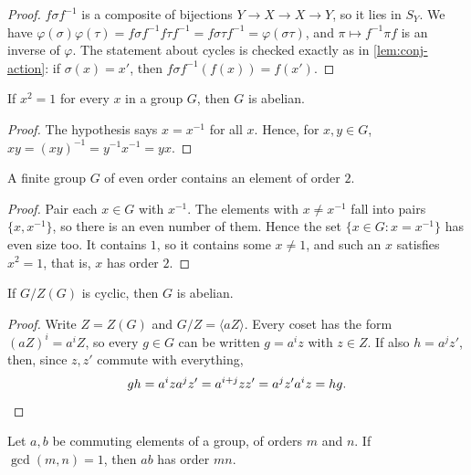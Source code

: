 \begin{proof}
	\(f\sigma f^{-1}\) is a composite of bijections \(Y \to X \to X \to Y\), so it lies in
	\(S_Y\). We have
	\(\varphi(\sigma)\varphi(\tau) = f\sigma f^{-1} f\tau f^{-1} = f\sigma\tau f^{-1}
	= \varphi(\sigma\tau)\), and \(\pi \mapsto f^{-1}\pi f\) is an inverse of
	\(\varphi\). The statement about cycles is checked exactly as in
	\autoref{lem:conj-action}: if \(\sigma(x) = x'\), then
	\(f\sigma f^{-1}(f(x)) = f(x')\).
\end{proof}

\begin{lemma}\label{lem:exponent-two}
	If \(x^2 = 1\) for every \(x\) in a group \(G\), then \(G\) is abelian.
\end{lemma}

\begin{proof}
	The hypothesis says \(x = x^{-1}\) for all \(x\). Hence, for \(x, y \in G\),
	\(xy = (xy)^{-1} = y^{-1}x^{-1} = yx\).
\end{proof}

\begin{lemma}\label{lem:even-order}
	A finite group \(G\) of even order contains an element of order \(2\).
\end{lemma}

\begin{proof}
	Pair each \(x \in G\) with \(x^{-1}\). The elements with \(x \neq x^{-1}\) fall into
	pairs \(\{x, x^{-1}\}\), so there is an even number of them. Hence the set
	\(\{x \in G : x = x^{-1}\}\) has even size too. It contains \(1\), so it contains some
	\(x \neq 1\), and such an \(x\) satisfies \(x^2 = 1\), that is, \(x\) has order \(2\).
\end{proof}

\begin{lemma}\label{lem:center-cyclic}
	If \(G/Z(G)\) is cyclic, then \(G\) is abelian.
\end{lemma}

\begin{proof}
	Write \(Z = Z(G)\) and \(G/Z = \langle aZ\rangle\). Every coset has the form
	\((aZ)^i = a^iZ\), so every \(g \in G\) can be written \(g = a^i z\) with
	\(z \in Z\). If also \(h = a^j z'\), then, since \(z, z'\) commute with everything,
	\[
		gh = a^i z a^j z' = a^{i+j}zz' = a^j z' a^i z = hg. \qedhere
	\]
\end{proof}

\begin{lemma}\label{lem:coprime-orders}
	Let \(a, b\) be commuting elements of a group, of orders \(m\) and \(n\). If
	\(\gcd(m,n) = 1\), then \(ab\) has order \(mn\).
\end{lemma}

